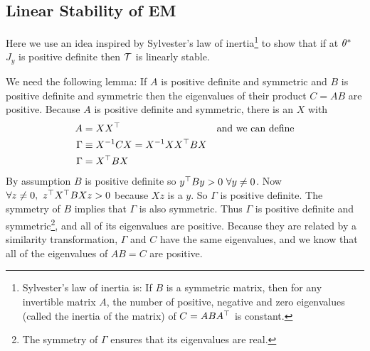 \subsection*{Linear Stability of EM}
\label{em_stabiltiy}

Here we use an idea inspired by Sylvester's law of
inertia\footnote{Sylvester's law of inertia is: If $B$ is a symmetric
  matrix, then for any invertible matrix $A$, the number of positive,
  negative and zero eigenvalues (called the inertia of the matrix) of
  $C = A B A^\top$ is constant.} to show that if at
${\theta^*}$ $J_y$ is positive definite then $\EMmap$ is linearly
stable.

We need the following lemma: If $A$ is positive definite and symmetric
and $B$ is positive definite and symmetric then the eigenvalues of
their product $C = AB$ are positive.  Because $A$ is positive
definite and symmetric, there is an $X$ with
\begin{align*}
  A &= X X^\top  &&\text{and we can define}\\
  \Gamma &\equiv X^{-1} C X = X^{-1} X X^\top B X \\
  \Gamma &= X^\top B X \\
\end{align*}
By assumption $B$ is positive definite so
$y^\top B y > 0 ~ \forall y \neq 0$.  Now
$\forall z \neq 0, ~ z^\top X^\top B X z > 0$ because $Xz$
is a $y$.  So $\Gamma$ is positive definite.  The symmetry of $B$
implies that $\Gamma$ is also symmetric.  Thus $\Gamma$ is positive
definite and symmetric\footnote{The symmetry of $\Gamma$ ensures that
  its eigenvalues are real.}, and all of its eigenvalues are positive.
Because they are related by a similarity transformation, $\Gamma$ and
$C$ have the same eigenvalues, and we know that all of the eigenvalues
of $AB = C$ are positive.

